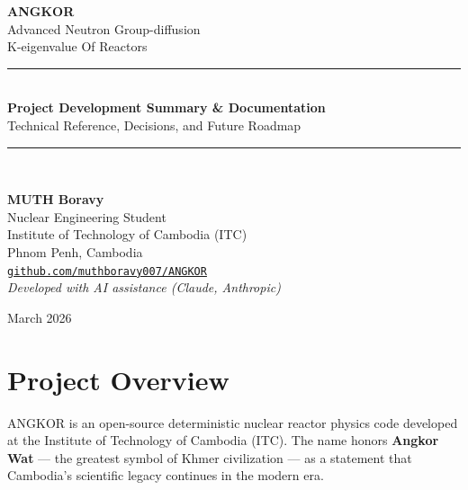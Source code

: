 \documentclass[12pt,a4paper]{article}
\begin{document}
\begin{titlepage}
    \centering
    \vspace*{2cm}

    {\Huge\bfseries\color{angkorblue} ANGKOR}\\[0.5cm]
    {\Large\color{angkorgold}
        Advanced Neutron Group-diffusion\\
        K-eigenvalue Of Reactors}\\[1.5cm]

    \rule{\linewidth}{0.5mm}\\[0.4cm]
    {\large\bfseries Project Development Summary \& Documentation}\\
    {\normalsize Technical Reference, Decisions, and Future Roadmap}\\
    \rule{\linewidth}{0.5mm}\\[2cm]

    \begin{minipage}{0.6\textwidth}
        \centering
        {\large\textbf{MUTH Boravy}}\\
        Nuclear Engineering Student\\
        Institute of Technology of Cambodia (ITC)\\
        Phnom Penh, Cambodia\\[0.5cm]
        \texttt{\href{https://github.com/muthboravy007/ANGKOR}
        {github.com/muthboravy007/ANGKOR}}\\[0.5cm]
        \textit{Developed with AI assistance (Claude, Anthropic)}
    \end{minipage}

    \vfill
    {\large March 2026}
\end{titlepage}

\tableofcontents
\newpage

\section{Project Overview}

ANGKOR is an open-source deterministic nuclear reactor physics code developed
at the Institute of Technology of Cambodia (ITC). The name honors
\textbf{Angkor Wat} --- the greatest symbol of Khmer civilization --- as a
statement that Cambodia's scientific legacy continues in the modern era.
\end{document}
